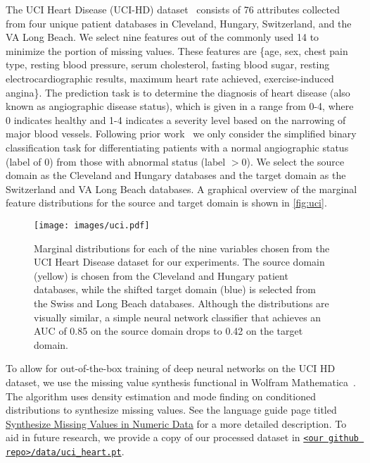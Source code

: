 The UCI Heart Disease (UCI-HD) dataset~\citep{misc_heart_disease_45} consists of 76 attributes collected from four unique patient databases in Cleveland, Hungary, Switzerland, and the VA Long Beach.
We select nine features out of the commonly used 14 to minimize the portion of missing values.
These features are \{age, sex, chest pain type, resting blood pressure, serum cholesterol, fasting blood sugar, resting electrocardiographic results, maximum heart rate achieved, exercise-induced angina\}.
The prediction task is to determine the diagnosis of heart disease (also known as angiographic disease status), which is given in a range from 0-4, where 0 indicates healthy and 1-4 indicates a severity level based on the narrowing of major blood vessels.
Following prior work~\citep{Chaki2015ACO} we only consider the simplified binary classification task for differentiating patients with a normal angiographic status (label of 0) from those with abnormal status (label $>0$).
We select the source domain as the Cleveland and Hungary databases and the target domain as the Switzerland and VA Long Beach databases.
A graphical overview of the marginal feature distributions for the source and target domain is shown in \autoref{fig:uci}.

\begin{figure}
    \centering
    \texttt{[image: images/uci.pdf]}
    \caption{Marginal distributions for each of the nine variables chosen from the UCI Heart Disease dataset for our experiments. The source domain (yellow) is chosen from the Cleveland and Hungary patient databases,
        while the shifted target domain (blue) is selected from the Swiss and Long Beach databases. Although the distributions are visually similar, a simple neural network classifier that achieves an AUC of 0.85 on the source domain drops to 0.42 on the target domain.}
    \label{fig:uci}
\end{figure}

To allow for out-of-the-box training of deep neural networks on the UCI HD dataset, we use the missing value synthesis functional in Wolfram Mathematica~\citep{Mathematica}.
The algorithm uses density estimation and mode finding on conditioned distributions to synthesize missing values.
See the language guide page titled \href{https://www.wolfram.com/language/12/high-level-machine-learning/synthesize-missing-values-in-numeric-data.html?product=language}{Synthesize Missing Values in Numeric Data} for a more detailed description.
To aid in future research, we provide a copy of our processed dataset in \href{https://anonymous.4open.science/r/detectron-D7BA/data/uci_heart_torch.pt}{\texttt{<our github repo>/data/uci\_heart.pt}}.

